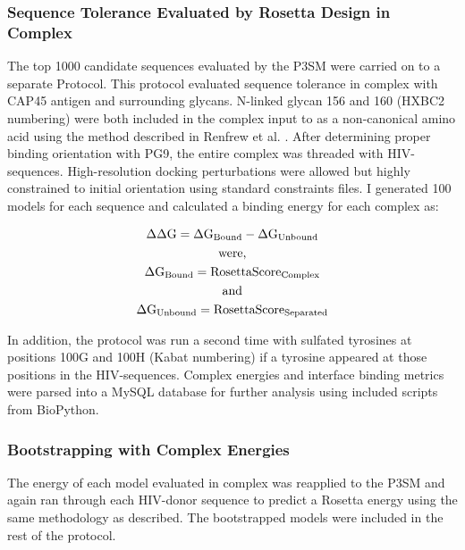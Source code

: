 \subsubsection{Sequence Tolerance Evaluated by Rosetta Design in Complex}
The top 1000 candidate sequences evaluated by the P3SM were carried on to a separate \rosetta Protocol. This protocol evaluated sequence tolerance in complex with CAP45 antigen and surrounding glycans. N-linked glycan 156 and 160 (HXBC2 numbering) were both included in the complex input to \rosetta as a non-canonical amino acid using the method described in Renfrew et al. \citep{Renfrew:2012ci}. After determining proper binding orientation with PG9, the entire complex was threaded with HIV-\naive sequences. High-resolution docking perturbations were allowed but highly constrained to initial orientation using standard \rosetta constraints files. I generated 100 models for each \naive sequence and calculated a binding energy for each complex as:

\begin{gather*}
    \Delta \Delta \textup{G} = \Delta \textup{G}_{\textup{Bound}} - \Delta \textup{G}_{\textup{Unbound}} \\
    \textup{were,} \\
    \Delta \textup{G}_{\textup{Bound}} = \textup{RosettaScore}_{\textup{Complex}} \\
    \textup{and}\\
    \Delta \textup{G}_{\textup{Unbound}} = \textup{RosettaScore}_{\textup{Separated}}
\end{gather*}

In addition, the protocol was run a second time with sulfated tyrosines at positions 100G and 100H (Kabat numbering) if a tyrosine appeared at those positions in the HIV-\naive sequences. Complex energies and interface binding metrics were parsed into a MySQL database for further analysis using included scripts from BioPython.

\subsubsection{Bootstrapping with Complex Energies}
The energy of each model evaluated in complex was reapplied to the P3SM and again ran through each HIV-\naive donor sequence to predict a Rosetta energy using the same methodology as described. The bootstrapped models were included in the rest of the protocol.

